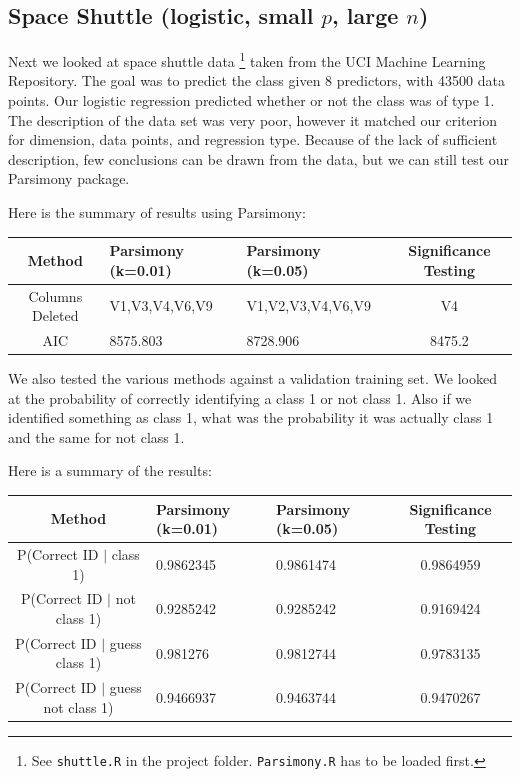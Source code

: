 \documentclass[letter]{article}
\newcounter{foot}
\begin{document}
\subsection{Space Shuttle \cite{shuttle} (logistic, small $p$, large $n$)}
Next we looked at space shuttle data 
\footnote{See \texttt{shuttle.R} in the project folder. \texttt{Parsimony.R} has to be loaded first.}
taken from the UCI Machine Learning Repository. The goal was to predict the class given 8 predictors, with 43500 data points. Our logistic regression predicted whether or not the class was of type 1.  The description of the data set was very poor, however it matched our criterion for dimension, data points, and regression type. Because of the lack of sufficient description, few conclusions can be drawn from the data, but we can still test our Parsimony package.

Here is the summary of results using Parsimony:

\begin{tabular}{ | c | p{3cm} | p{3.3cm} | c  |}
\hline
Method&Parsimony (k=0.01) & Parsimony (k=0.05) & Significance Testing \\
\hline
Columns Deleted& V1,V3,V4,V6,V9 & V1,V2,V3,V4,V6,V9 & V4 \\
\hline
AIC & 8575.803 & 8728.906 & 8475.2 \\
\hline
\end{tabular}

We also tested the various methods against a validation training set. We looked at the probability of correctly identifying a class 1 or not class 1. Also if we identified something as class 1, what was the probability it was actually class 1 and the same for not class 1.

Here is a summary of the results:

\begin{tabular}{ | c | p{3cm} | p{3.3cm} | c  |}
\hline
Method&Parsimony (k=0.01) & Parsimony (k=0.05) & Significance Testing \\
\hline
P(Correct ID $|$ class 1) & 0.9862345 & 0.9861474 & 0.9864959 \\
\hline
P(Correct ID $|$ not class 1) & 0.9285242 & 0.9285242 & 0.9169424 \\
\hline
P(Correct ID $|$ guess class 1) & 0.981276 & 0.9812744 & 0.9783135 \\
\hline
P(Correct ID $|$ guess not class 1) & 0.9466937 & 0.9463744 & 0.9470267  \\
\hline
\end{tabular}
\end{document}
